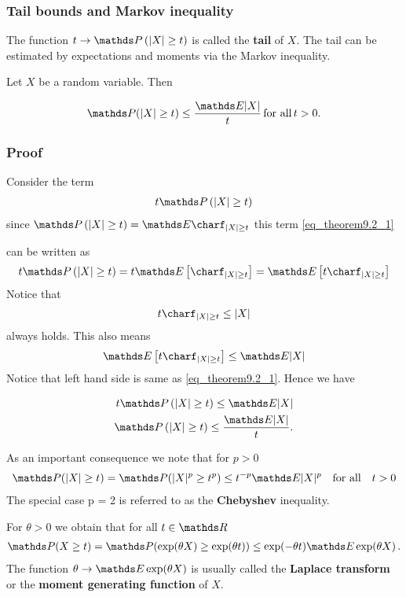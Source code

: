 \documentclass[a4paper, english, headtopline=0.08em, headsepline=0.04em, left = 1cm, right = 1cm, DIV=15]{article}
\begin{document}
\subsubsection*{Tail bounds and Markov inequality}
The function $t \rightarrow \PP\left(|X| \geq t\right)$ is called the \textbf{tail} of $X$. The tail can be estimated by expectations and moments
via the Markov inequality.
\begin{theorem} \label{theorem9.3}
	Let $X$ be a random variable. Then
\end{theorem}
\begin{align} 
	\PP (|X|\geq t)\leq{\frac{\EE |X|}{t}} \, \text{for all} \, t>0. 
\end{align}
\subsubsection*{Proof}
Consider the term
\begin{align} \label{eq_theorem9.2_1}
	t\PP \left(|X| \geq t\right)
\end{align}
since $\PP \left(|X| \geq t\right) = \EE \charf_{|X| \geq t}$ this term \cref{eq_theorem9.2_1}

can be written as
\begin{align} \label{eq_theorem9.2_2}
	t\PP \left(|X| \geq t\right) = t \EE \left[\charf_{|X| \geq t}\right]  = \EE \left[t\charf_{|X| \geq t}\right]
\end{align}
Notice that 
\begin{align*}
	t\charf_{|X| \geq t} \leq |X|
\end{align*}
always holds. This also means
\begin{align*}
	\EE \left[t\charf_{|X| \geq t}\right] \leq \EE |X|
\end{align*}
Notice that left hand side is same as \cref{eq_theorem9.2_1}. Hence we have

\begin{align*}
	t\PP \left(|X| \geq t\right) \leq \EE |X| \\
	\PP \left(|X| \geq t\right) \leq \frac{\EE |X|}{t}.
\end{align*}
\begin{remark}
	As an important consequence we note that for $p > 0$
	\begin{align*}
		\PP (|X|\geq t)= \PP (|X|^{p}\geq t^{p}) \leq t^{-p}\mathbb{E}|X|^{p} \quad \text{for all} \quad t>0
	\end{align*}
	The special case p = 2 is referred to as the \textbf{Chebyshev} inequality.
\end{remark}
\begin{remark}
	For $\theta > 0$ we obtain that for all $t \in \RR$
	\begin{align*}
		\PP (X\geq t)=\PP (\exp(\theta X)\geq\exp(\theta t)) 
		\leq \exp(-\theta t)\mathbb{E}\exp(\theta X)\,.
	\end{align*}
	The function $\theta \rightarrow \EE \exp(\theta X)$ is usually called the 
	\textbf{Laplace transform} or the \textbf{moment generating function} of $X$.
\end{remark}
\end{document}
